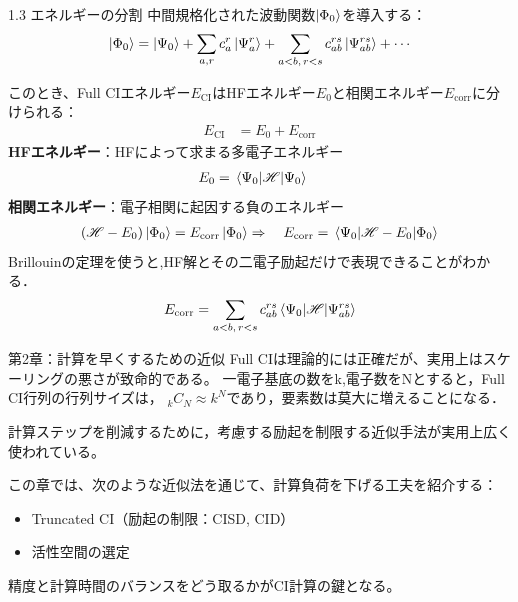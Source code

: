 \documentclass{beamer}
\begin{document}
\begin{frame}{1.3
  エネルギーの分割}
  中間規格化された波動関数$\ket{\Phi_0}$を導入する：
  \begin{align*}
  \ket{ \Phi_0} = \ket{\Psi_0}+ \sum_{a, r} c_a^r \ket{\Psi_a^r} + \sum_{a < b,\, r < s} c_{ab}^{rs} \ket{\Psi_{ab}^{rs}} + \cdots
  \end{align*}
  
  このとき、Full CIエネルギー$E_{\mathrm{CI}}$はHFエネルギー$E_0$と相関エネルギー$E_{\mathrm{corr}}$に分けられる：
  \begin{align*}
  E_{\mathrm{CI}} &= E_0 + E_{\mathrm{corr}} 
  \end{align*}
  \textbf{HFエネルギー}：HFによって求まる多電子エネルギー
  \begin{align*}
  E_0 &= \mel{\Psi_0}{\mathscr{H}}{\Psi_0}
  \end{align*}
  \textbf{相関エネルギー}：電子相関に起因する負のエネルギー
  \begin{align*}
  (\mathscr{H} - E_0)\ket{\Phi_0} = E_{\mathrm{corr}} \ket{\Phi_0} 
  \Rightarrow \quad E_{\mathrm{corr}} = \mel{\Psi_0}{\mathscr{H} - E_0}{\Phi_0}
  \end{align*}
  Brillouinの定理を使うと,HF解とその二電子励起だけで表現できることがわかる．
  \begin{align*}
  E_{\mathrm{corr}} = \sum_{a<b,\, r<s} c_{ab}^{rs} \mel{\Psi_0}{\mathscr{H}}{\Psi_{ab}^{rs}}
  \end{align*}
  \end{frame}
  
\begin{frame}{第2章：計算を早くするための近似}
  Full CIは理論的には正確だが、実用上はスケーリングの悪さが致命的である。
  一電子基底の数をk,電子数をNとすると，Full CI行列の行列サイズは，
  ${}_k C_N \approx k^N$であり，要素数は莫大に増えることになる．

  計算ステップを削減するために，考慮する励起を制限する近似手法が実用上広く使われている。

  \vspace{1em}
  この章では、次のような近似法を通じて、計算負荷を下げる工夫を紹介する：
  \begin{itemize}
    \item Truncated CI（励起の制限：CISD, CID）
    \item 活性空間の選定
  \end{itemize}
  
  \vspace{1em}
  精度と計算時間のバランスをどう取るかがCI計算の鍵となる。
  \end{frame}
  
\end{document}
